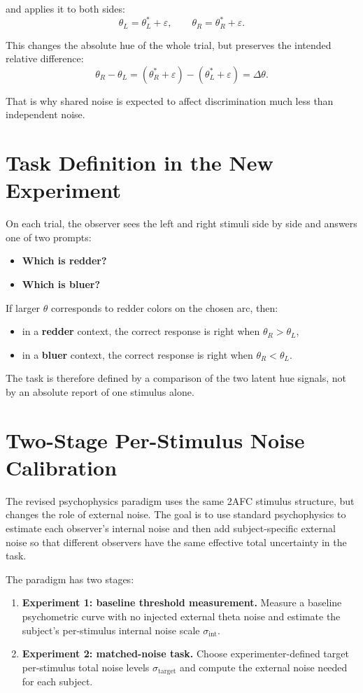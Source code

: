 \documentclass[11pt]{article}
\begin{document}
and applies it to both sides:
\[
\theta_L = \theta_L^{\ast} + \varepsilon,
\qquad
\theta_R = \theta_R^{\ast} + \varepsilon.
\]

This changes the absolute hue of the whole trial, but preserves the intended
relative difference:
\[
\theta_R - \theta_L
= (\theta_R^{\ast} + \varepsilon) - (\theta_L^{\ast} + \varepsilon)
= \Delta\theta.
\]

That is why shared noise is expected to affect discrimination much less than
independent noise.

\section{Task Definition in the New Experiment}

On each trial, the observer sees the left and right stimuli side by side and
answers one of two prompts:
\begin{itemize}[leftmargin=2em]
\item \textbf{Which is redder?}
\item \textbf{Which is bluer?}
\end{itemize}

If larger $\theta$ corresponds to redder colors on the chosen arc, then:
\begin{itemize}[leftmargin=2em]
\item in a \textbf{redder} context, the correct response is right when
$\theta_R > \theta_L$,
\item in a \textbf{bluer} context, the correct response is right when
$\theta_R < \theta_L$.
\end{itemize}

The task is therefore defined by a comparison of the two latent hue signals,
not by an absolute report of one stimulus alone.

\section{Two-Stage Per-Stimulus Noise Calibration}

The revised psychophysics paradigm uses the same 2AFC stimulus structure, but
changes the role of external noise. The goal is to use standard psychophysics
to estimate each observer's internal noise and then add subject-specific
external noise so that different observers have the same effective total
uncertainty in the task.

The paradigm has two stages:
\begin{enumerate}[leftmargin=2em]
\item \textbf{Experiment 1: baseline threshold measurement.} Measure a
baseline psychometric curve with no injected external theta noise and estimate
the subject's per-stimulus internal noise scale $\sigma_{\mathrm{int}}$.
\item \textbf{Experiment 2: matched-noise task.} Choose experimenter-defined
target per-stimulus total noise levels $\sigma_{\mathrm{target}}$ and compute
the external noise needed for each subject.
\end{enumerate}
\end{document}
